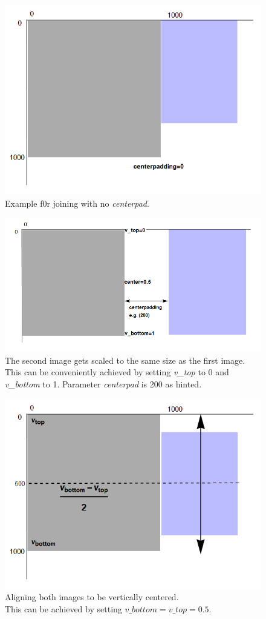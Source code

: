 \documentclass[a4paper, 12pt, bibliography=totoc]{scrartcl}
\begin{document}
\begin{figure}[H]
	\centering
	\includegraphics[width=0.6\linewidth]{images/svgjoinpad0.png}
	\caption{Example f0r joining with no \textit{centerpad}.}
	\label{fig:svgjoinpad0}
\end{figure}

\begin{figure}[H]
	\centering
	\includegraphics[width=0.8\linewidth]{images/svgjoinscale1.png}
	\caption{The second image gets scaled to the same size as the first image. This can be conveniently achieved by setting \textit{v\_top} to 0 and \textit{v\_bottom} to 1. Parameter \textit{centerpad} is 200 as hinted.}
	\label{fig:svgjoinscale1}
\end{figure}

\begin{figure}[H]
	\centering
	\includegraphics[width=0.8\linewidth]{images/svgjoinpad0centered.png}
	\caption{Aligning both images to be vertically centered. \\
		This can be achieved by setting $v\_bottom=v\_top=0.5$.}
	\label{fig:svgjoinpad0centered}
\end{figure}
\end{document}
